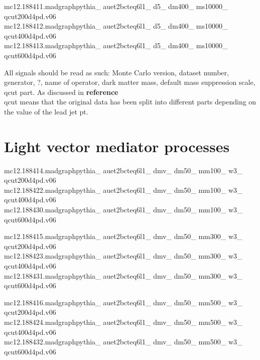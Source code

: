 mc12.188411.madgraphpythia\_  auet2bcteq6l1\_  d5\_  dm400\_  ms10000\_  \\ qcut200d4pd.v06\\
mc12.188412.madgraphpythia\_  auet2bcteq6l1\_  d5\_  dm400\_  ms10000\_  \\ qcut400d4pd.v06\\
mc12.188413.madgraphpythia\_  auet2bcteq6l1\_  d5\_  dm400\_  ms10000\_  \\ qcut600d4pd.v06

All signals should be read as such: Monte Carlo version, dataset number, generator, ?, name of operator,  dark matter mass, default mass suppression scale, \\ qcut part. As discussed in \textbf{reference} \\ qcut means that the original data has been split into different parts depending on the value of the lead jet pt. 
\section{Light vector mediator processes}
mc12.188414.madgraphpythia\_ auet2bcteq6l1\_ dmv\_ dm50\_ mm100\_ w3\_ \\ qcut200d4pd.v06\\ mc12.188422.madgraphpythia\_ auet2bcteq6l1\_ dmv\_ dm50\_ mm100\_ w3\_ \\ qcut400d4pd.v06\\
mc12.188430.madgraphpythia\_ auet2bcteq6l1\_ dmv\_ dm50\_ mm100\_ w3\_ \\ qcut600d4pd.v06
 
mc12.188415.madgraphpythia\_ auet2bcteq6l1\_ dmv\_ dm50\_ mm300\_ w3\_ \\ qcut200d4pd.v06\\
mc12.188423.madgraphpythia\_ auet2bcteq6l1\_ dmv\_ dm50\_ mm300\_ w3\_ \\ qcut400d4pd.v06\\
mc12.188431.madgraphpythia\_ auet2bcteq6l1\_ dmv\_ dm50\_ mm300\_ w3\_ \\ qcut600d4pd.v06

mc12.188416.madgraphpythia\_ auet2bcteq6l1\_ dmv\_ dm50\_ mm500\_ w3\_ \\ qcut200d4pd.v06\\
mc12.188424.madgraphpythia\_ auet2bcteq6l1\_ dmv\_ dm50\_ mm500\_ w3\_ \\ qcut400d4pd.v06\\
mc12.188432.madgraphpythia\_ auet2bcteq6l1\_ dmv\_ dm50\_ mm500\_ w3\_ \\ qcut600d4pd.v06

